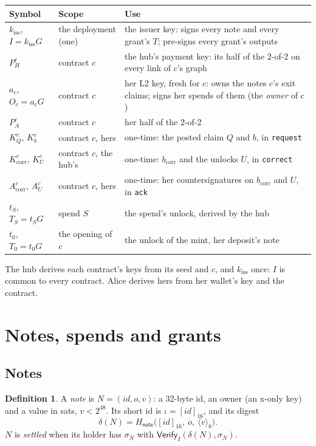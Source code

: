 \documentclass[11pt]{article}
\theoremstyle{plain}
\theoremstyle{definition}
\newtheorem{definition}{Definition}
\newcommand{\bcorr}{b_{\mathrm{corr}}}
\newcommand{\tx}[1]{\texttt{#1}}
\newcommand{\be}[2]{\langle #1\rangle_{#2}}
\newcommand{\pre}[2]{[#1]_{#2}}
\newcommand{\Ht}[1]{H_{\textsf{#1}}}
\newcommand{\Vfy}{\mathsf{Verify}}
\newcommand{\kiss}{k_{\mathrm{iss}}}
\newcommand{\PH}{P_H^{c}}
\newcommand{\Oc}{O_c}
\newcommand{\KQ}{K_{Q}^{c}}
\newcommand{\Kb}{K_{b}^{c}}
\newcommand{\Kcorr}{K_{\mathrm{corr}}^{c}}
\newcommand{\KU}{K_{U}^{c}}
\newcommand{\Acorr}{A_{\mathrm{corr}}^{c}}
\newcommand{\AU}{A_{U}^{c}}
\begin{document}
\begin{center}
\begin{tabularx}{\linewidth}{llL}
\toprule
Symbol & Scope & Use \\
\midrule
$\kiss$, $I = \kiss G$ & the deployment (one) & the issuer key: signs every note and every grant's $T$; pre-signs every grant's outputs \\
$\PH$ & contract $c$ & the hub's payment key: its half of the 2-of-2 on every link of $c$'s graph \\
$a_c$, $\Oc = a_cG$ & contract $c$ & her L2 key, fresh for $c$: owns the notes $c$'s exit claims; signs her spends of them (the \emph{owner} of $c$) \\
$P_A^c$ & contract $c$ & her half of the 2-of-2 \\
$\KQ$, $\Kb$ & contract $c$, hers & one-time: the posted claim $Q$ and $b$, in \tx{request} \\
$\Kcorr$, $\KU$ & contract $c$, the hub's & one-time: $\bcorr$ and the unlocks $U$, in \tx{correct} \\
$\Acorr$, $\AU$ & contract $c$, hers & one-time: her countersignatures on $\bcorr$ and $U$, in \tx{ack} \\
$t_S$, $T_S = t_SG$ & spend $S$ & the spend's unlock, derived by the hub \\
$t_0$, $T_0 = t_0G$ & the opening of $c$ & the unlock of the mint, her deposit's note \\
\bottomrule
\end{tabularx}
\end{center}

The hub derives each contract's keys from its seed and $c$, and $\kiss$
once: $I$ is common to every contract. Alice derives hers from her
wallet's key and the contract.

\section{Notes, spends and grants}

\subsection{Notes}

\begin{definition}
A \emph{note} is $N = (\mathit{id}, o, v)$: a 32-byte id, an owner (an
x-only key) and a value in sats, $v < 2^{48}$. Its short id is $\iota =
\pre{\mathit{id}}{16}$, and its digest
\[
  \delta(N) = \Ht{note}\big(\pre{\mathit{id}}{16},\ o,\ \be{v}{8}\big).
\]
$N$ is \emph{settled} when its holder has $\sigma_N$ with $\Vfy_I(\delta(N),
\sigma_N)$.
\end{definition}
\end{document}
